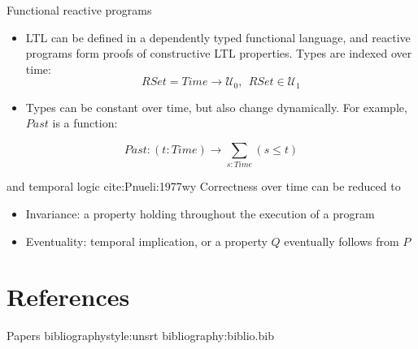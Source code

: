 \documentclass[aspectratio=169]{beamer}
\newcommand{\univ}[1]{\mathcal{U}_{#1}}
\begin{document}
\begin{frame}[label={sec:orga0143a2}]{Functional reactive programs}
\begin{itemize}
\item LTL can be defined in a dependently typed functional language, and
reactive programs form proofs of constructive LTL properties.
Types are \alert{indexed} over time: $$RSet = Time \rightarrow \univ{0}, ~~ RSet \in \univ{1}$$
\end{itemize}


\begin{itemize}
\item Types can be constant over time, but also change dynamically. For example,
\(Past\) is a function:
\end{itemize}


$$Past : (t: Time) \rightarrow \sum_{s: Time} (s \leq t)$$
\end{frame}



\begin{frame}[label={sec:org6b77b4d}]{and temporal logic cite:Pnueli:1977wy}
Correctness over time can be reduced to

\begin{itemize}
\item \alert{Invariance}: a property holding throughout the execution of a program

\item \alert{Eventuality}: temporal implication, or a property \(Q\) eventually follows from \(P\)
\end{itemize}
\end{frame}










\section{References}
\label{sec:org80088eb}
\begin{frame}[label={sec:orga8022ff}]{Papers}
bibliographystyle:unsrt
bibliography:biblio.bib
\end{frame}
\end{document}
